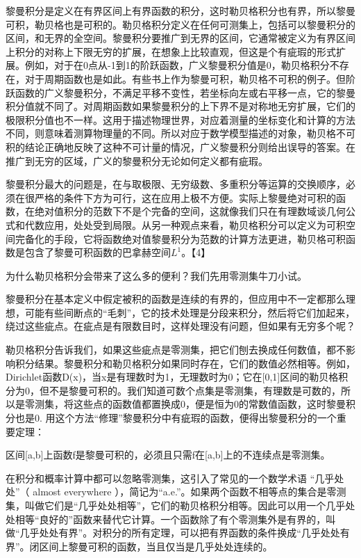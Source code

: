 黎曼积分是定义在有界区间上有界函数的积分，这时勒贝格积分也有界，所以黎曼可积，勒贝格也是可积的。勒贝格积分定义在任何可测集上，包括可以黎曼积分的区间，和无界的全空间。黎曼积分要推广到无界的区间，它通常被定义为有界区间上积分的对称上下限无穷的扩展，在想象上比较直观，但这是个有疵瑕的形式扩展。例如，对于在0点从-1到1的阶跃函数，广义黎曼积分值是0，勒贝格积分不存在，对于周期函数也是如此。有些书上作为黎曼可积，勒贝格不可积的例子。但阶跃函数的广义黎曼积分，不满足平移不变性，若坐标向左或右平移一点，它的黎曼积分值就不同了。对周期函数如果黎曼积分的上下界不是对称地无穷扩展，它们的极限积分值也不一样。这用于描述物理世界，对应着测量的坐标变化和计算的方法不同，则意味着测算物理量的不同。所以对应于数学模型描述的对象，勒贝格不可积的结论正确地反映了这种不可计量的情况，广义黎曼积分则给出误导的答案。在推广到无穷的区域，广义的黎曼积分无论如何定义都有疵瑕。

黎曼积分最大的问题是，在与取极限、无穷级数、多重积分等运算的交换顺序，必须在很严格的条件下方为可行，这在应用上极不方便。实际上黎曼绝对可积的函数，在绝对值积分的范数下不是个完备的空间，这就像我们只在有理数域谈几何公式和代数应用，处处受到局限。从另一种观点来看，勒贝格积分可以定义为可积空间完备化的手段，它将函数绝对值黎曼积分为范数的计算方法更进，勒贝格可积函数是包含了黎曼可积函数的巴拿赫空间$ L^{1} $。【4】

为什么勒贝格积分会带来了这么多的便利？我们先用零测集牛刀小试。

黎曼积分在基本定义中假定被积的函数是连续的有界的，但应用中不一定都那么理想，可能有些间断点的``毛刺''，它的技术处理是分段来积分，然后将它们加起来，绕过这些疵点。在疵点是有限数目时，这样处理没有问题，但如果有无穷多个呢？

勒贝格积分告诉我们，如果这些疵点是零测集，把它们刨去换成任何数值，都不影响积分结果。黎曼积分和勒贝格积分如果同时存在，它们的数值必然相等。例如，Dirichlet函数D(x)，当x是有理数时为1，无理数时为0；它在[0,1]区间的勒贝格积分为0，但不是黎曼可积的。我们知道可数个点集是零测集，有理数是可数的，所以是零测集，将这些点的函数值都置换成0，便是恒为0的常数值函数，这时黎曼积分也是0. 用这个方法``修理''黎曼积分中有疵瑕的函数，便得出黎曼积分的一个重要定理：

\kaishu\setlength{\leftskip}{1em}

区间[a,b]上函数f是黎曼可积的，必须且只需f在[a,b]上的不连续点是零测集。

\songti\setlength{\leftskip}{0em}


在积分和概率计算中都可以忽略零测集，这引入了常见的一个数学术语 ``几乎处处''（ almost everywhere ），简记为``a.e.''。如果两个函数不相等点的集合是零测集，叫做它们是``几乎处处相等''，它们的勒贝格积分相等。因此可以用一个几乎处处相等``良好的''函数来替代它计算。一个函数除了有个零测集外是有界的，叫做``几乎处处有界''。对积分的所有定理，可以把有界函数的条件换成``几乎处处有界''。闭区间上黎曼可积的函数，当且仅当是几乎处处连续的。

